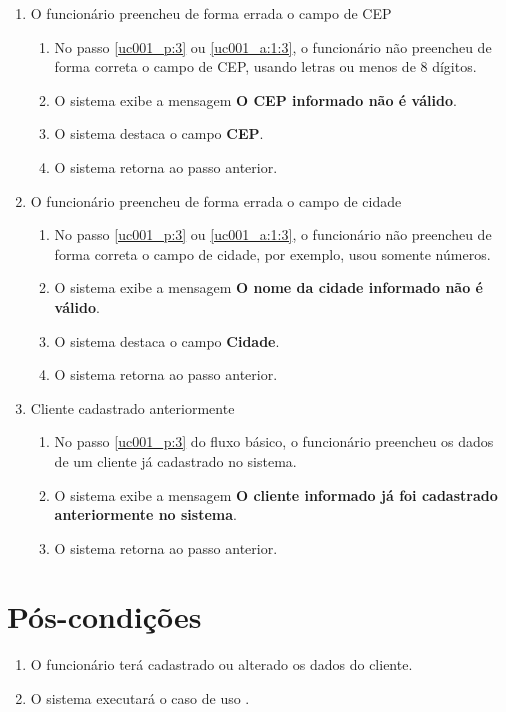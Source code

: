 \begin{enumerate}[label=E\arabic*]
	\item O funcionário preencheu de forma errada o campo de CEP \label{uc001_e:5}
	\begin{enumerate}[label*=.\arabic*]		
		\item[] No passo \ref{uc001_p:3} ou \ref{uc001_a:1:3}, o funcionário não preencheu de forma correta o campo de CEP, usando letras ou menos de 8 dígitos.		
		\item O sistema exibe a mensagem \textbf{O CEP informado não é válido}.
		\item O sistema destaca o campo \textbf{CEP}.
		\item O sistema retorna ao passo anterior.
	\end{enumerate}

	\item O funcionário preencheu de forma errada o campo de cidade \label{uc001_e:6}
	\begin{enumerate}[label*=.\arabic*]		
		\item[] No passo \ref{uc001_p:3} ou \ref{uc001_a:1:3}, o funcionário não preencheu de forma correta o campo de cidade, por exemplo, usou somente números.		
		\item O sistema exibe a mensagem \textbf{O nome da cidade informado não é válido}.
		\item O sistema destaca o campo \textbf{Cidade}.
		\item O sistema retorna ao passo anterior.
	\end{enumerate}

	\item Cliente cadastrado anteriormente \label{uc001_e:7}
	\begin{enumerate}[label*=.\arabic*]
		\item[] No passo \ref{uc001_p:3} do fluxo básico, o funcionário preencheu os dados de um cliente já cadastrado no sistema.
		\item O sistema exibe a mensagem \textbf{O cliente informado já foi cadastrado anteriormente no sistema}.
		\item O sistema retorna ao passo anterior.
	\end{enumerate}
\end{enumerate}

\section{Pós-condições}

\begin{enumerate}
	\item O funcionário terá cadastrado ou alterado os dados do cliente.
	\item O sistema executará o caso de uso .	
\end{enumerate}

